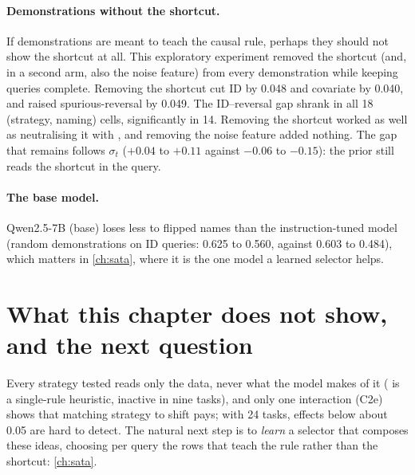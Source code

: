 \paragraph{Demonstrations without the shortcut.}
If demonstrations are meant to teach the causal rule, perhaps they should not show the shortcut at all.
This exploratory experiment removed the shortcut (and, in a second arm, also the noise feature) from every demonstration while keeping queries complete.
Removing the shortcut cut ID \AUROC by 0.048 and covariate \AUROC by 0.040, and raised spurious-reversal \AUROC by 0.049.
The ID--reversal gap shrank in all 18 (strategy, naming) cells, significantly in 14.
Removing the shortcut worked as well as neutralising it with , and removing the noise feature added nothing.
The gap that remains follows $\sigma_t$ ($+0.04$ to $+0.11$ against $-0.06$ to $-0.15$): the prior still reads the shortcut in the query.


\paragraph{The base model.}
Qwen2.5-7B (base) loses less to flipped names than the instruction-tuned model (random demonstrations on ID queries: 0.625 to 0.560, against 0.603 to 0.484), which matters in \autoref{ch:sata}, where it is the one model a learned selector helps.

\section{What this chapter does not show, and the next question}

Every strategy tested reads only the data, never what the model makes of it ( is a single-rule heuristic, inactive in nine tasks), and only one interaction (C2e) shows that matching strategy to shift pays; with 24 tasks, effects below about 0.05 \AUROC are hard to detect.
The natural next step is to \emph{learn} a selector that composes these ideas, choosing per query the rows that teach the rule rather than the shortcut: \autoref{ch:sata}.
